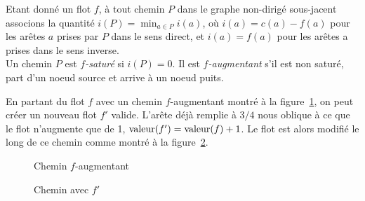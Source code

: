 \begin{mydef}
  Etant donné un flot $f$, à tout chemin $P$ dans le graphe non-dirigé sous-jacent associons la quantité $i(P) = \min_{a \in P} i(a)$, où $i(a) = c(a) − f(a)$ pour les arêtes $a$ prises par $P$ dans le sens direct, et $i(a) = f (a)$ pour les arêtes a prises dans le sens inverse.\\
  Un chemin $P$ est \emph{$f$-saturé} si $i(P) = 0$. Il est \emph{$f$-augmentant} s'il est non saturé, part d'un noeud source et arrive à un noeud puits.
\end{mydef}

\begin{myexem}
  En partant du flot $f$ avec un chemin $f$-augmentant
  montré à la figure~\ref{fig:faug},
  on peut créer un nouveau flot $f'$ valide.
  L'arête déjà remplie à $3/4$ nous oblique à ce que le flot n'augmente que de 1,
  $\operatorname{valeur}(f') = \operatorname{valeur}(f) + 1$.
  Le flot est alors modifié le long de ce chemin comme montré
  à la figure~\ref{fig:fprime}.
  \begin{figure}[h!]
    \centering
    \caption{Chemin $f$-augmentant}
    \label{fig:faug}
  \end{figure}
  \begin{figure}[h!]
    \centering
    \caption{Chemin avec $f'$}
    \label{fig:fprime}
  \end{figure}
\end{myexem}


